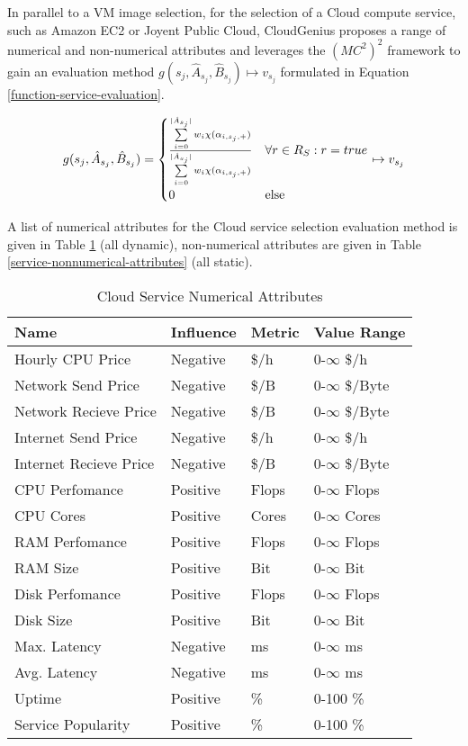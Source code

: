 \documentclass[10pt]{article}
\begin{document}
In parallel to a VM image selection, for the selection of a Cloud compute service, such as Amazon EC2 or Joyent Public Cloud, CloudGenius proposes a range of numerical and non-numerical attributes and leverages the $(MC^2)^2$ framework to gain an evaluation method $g(s_j, \hat{A}_{s_j}, \hat{B}_{s_j})\mapsto{}v_{s_j}$ formulated in Equation \ref{function-service-evaluation}.

\begin{equation}\label{function-service-evaluation}
g(s_j, \hat{A}_{s_j}, \hat{B}_{s_j}) = 
\begin{cases}
\sum\limits_{i=0}^{|\hat{A}_{s_j}|} w_i\chi(\alpha_{i,s_j,+})\over{\sum\limits_{i=0}^{|\hat{A}_{s_j}|} w_i\chi(\alpha_{i,s_j,+})} & \forall r \in R_S: r=true\\
0 & \text{else}
\end{cases}
\mapsto{} v_{s_j}
\end{equation}

A list of numerical attributes for the Cloud service selection evaluation method is given in Table \ref{service-numerical-attributes} (all dynamic), non-numerical attributes are given in Table \ref{service-nonnumerical-attributes} (all static).

\begin{table}[!h]
\centering
\caption{Cloud Service Numerical Attributes}\label{service-numerical-attributes}
\begin{tabular}{|l|l|l|l|} \hline
Name&Influence&Metric&Value Range\\ \hline
Hourly CPU Price&Negative&\$/h&0-$\infty$ \$/h\\
Network Send Price&Negative&\$/B&0-$\infty$ \$/Byte\\
Network Recieve Price&Negative&\$/B&0-$\infty$ \$/Byte\\
Internet Send Price&Negative&\$/h&0-$\infty$ \$/h\\
Internet Recieve Price&Negative&\$/B&0-$\infty$ \$/Byte\\
CPU Perfomance&Positive&Flops&0-$\infty$ Flops\\
CPU Cores&Positive&Cores&0-$\infty$ Cores\\
RAM Perfomance&Positive&Flops&0-$\infty$ Flops\\
RAM Size&Positive&Bit&0-$\infty$ Bit\\
Disk Perfomance&Positive&Flops&0-$\infty$ Flops\\
Disk Size&Positive&Bit&0-$\infty$ Bit\\
Max. Latency&Negative&ms&0-$\infty$ ms\\
Avg. Latency&Negative&ms&0-$\infty$ ms\\
Uptime&Positive&\%&0-100 \%\\
Service Popularity&Positive&\%&0-100 \%\\
\hline\end{tabular}
\end{table}
\end{document}
